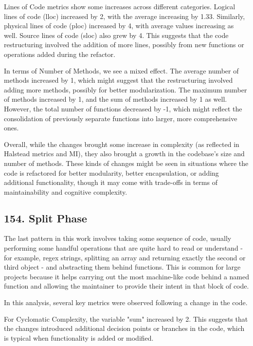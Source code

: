 Lines of Code metrics show some increases across different categories. Logical lines of code (lloc) increased by 2, with the average increasing by 1.33. Similarly, physical lines of code (ploc) increased by 4, with average values increasing as well. Source lines of code (sloc) also grew by 4. This suggests that the code restructuring involved the addition of more lines, possibly from new functions or operations added during the refactor.

In terms of Number of Methods, we see a mixed effect. The average number of methods increased by 1, which might suggest that the restructuring involved adding more methods, possibly for better modularization. The maximum number of methods increased by 1, and the sum of methods increased by 1 as well. However, the total number of functions decreased by -1, which might reflect the consolidation of previously separate functions into larger, more comprehensive ones.

Overall, while the changes brought some increase in complexity (as reflected in Halstead metrics and MI), they also brought a growth in the codebase's size and number of methods. These kinds of changes might be seen in situations where the code is refactored for better modularity, better encapsulation, or adding additional functionality, though it may come with trade-offs in terms of maintainability and cognitive complexity.

\subsection{154. Split Phase}

The last pattern in this work involves taking some sequence of code, usually performing some handful operations that are quite hard to read or understand - for example, regex strings, splitting an array and returning exactly the second or third object - and abstracting them
behind functions. This is common for large projects because it helps carrying out the most machine-like code behind a named function and allowing the maintainer to provide their intent in that block of code.

In this analysis, several key metrics were observed following a change in the code.

For Cyclomatic Complexity, the variable "sum" increased by 2. This suggests that the changes introduced additional decision points or branches in the code, which is typical when functionality is added or modified.

